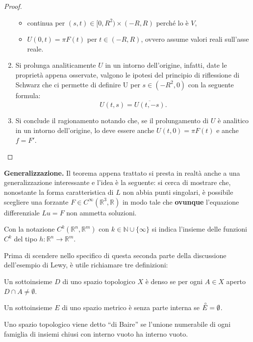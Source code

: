 \begin{example}
\begin{proof}
\begin{enumerate}[1.]
\begin{itemize}
\item
continua per $(s,t) \in [0,R^2) \times (-R,R)$ perché lo è $V$,
\item
$U(0,t)=\pi F(t)$ per $t\in (-R,R)$, ovvero assume valori reali sull'asse reale.
\end{itemize}
\item
Si prolunga analiticamente $U$ in un intorno dell'origine, infatti, 
date le proprietà appena osservate, valgono le ipotesi del principio di riflessione di Schwarz che ci permette 
di definire U per $s\in (-R^2,0)$ con la seguente formula: $$U(t,s)=\overline{U(t,-s)}.$$
\item
Si conclude il ragionamento notando che, se il prolungamento di $U$ è analitico in un intorno dell'origine, lo deve essere anche $U(t,0)=\pi F(t)$ e anche $f=F'$.
\end{enumerate}
\end{proof}

\textbf{Generalizzazione.} Il teorema appena trattato si presta in realtà anche a una generalizzazione interessante e l'idea è la seguente: si cerca di mostrare che, nonostante la forma caratteristica di $L$ non abbia punti singolari, è possibile scegliere una forzante $F \in C^{\infty} (\mathbb{R}^3, \mathbb{R})$ in modo tale che \textbf{ovunque} l'equazione differenziale $Lu=F$ non ammetta soluzioni.

\begin{remark}
Con la notazione $C^{k} (\mathbb{R}^n, \mathbb{R}^m)$ con $k \in \mathbb{N} \cup \{\infty\}$ si indica l'insieme delle funzioni $C^{k}$ del tipo $h:\mathbb{R}^n \rightarrow \mathbb{R}^m$.
\end{remark}

Prima di scendere nello specifico di questa seconda parte della discussione dell'esempio di Lewy, è utile richiamare tre definizioni:
\begin{definition}
Un sottoinsieme $D$ di uno spazio topologico $X$ è denso se per ogni $ A \in X$ aperto $D \cap A \neq \emptyset $.
\end{definition}
\begin{definition}
Un sottoinsieme $E$ di uno spazio metrico è senza parte interna se $\accentset{\circ}{E}=\emptyset$.
\end{definition}
\begin{definition}
Uno spazio topologico viene detto ``di Baire'' se l'unione numerabile di ogni famiglia di insiemi chiusi con interno vuoto ha interno vuoto.
\end{definition}


\end{example}

